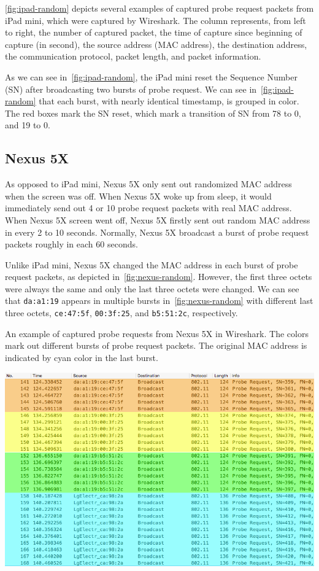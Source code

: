 	\autoref{fig:ipad-random} depicts several examples of captured probe request packets from iPad mini, which were captured by Wireshark. The column represents, from left to right, the number of captured packet, the time of capture since beginning of capture (in second), the source address (\ac{MAC} address), the destination address, the communication protocol, packet length, and packet information.
	
	As we can see in~\autoref{fig:ipad-random}, the iPad mini reset the Sequence Number (\ac{SN}) after broadcasting two bursts of probe request. We can see in~\autoref{fig:ipad-random} that each burst, with nearly identical timestamp, is grouped in color. The red boxes mark the \ac{SN} reset, which mark a transition of \ac{SN} from 78 to 0, and 19 to 0.


	\subsection{Nexus 5X} %
	\label{sub:lg_nexus_5x}
	As opposed to iPad mini, Nexus 5X only sent out randomized \ac{MAC} address when the screen was off. When Nexus 5X woke up from sleep, it would immediately send out 4 or 10 probe request packets with real \ac{MAC} address. When Nexus 5X screen went off, Nexus 5X firstly sent out random \ac{MAC} address in every 2 to 10 seconds. Normally, Nexus 5X broadcast a burst of probe request packets roughly in each 60 seconds.

	Unlike iPad mini, Nexus 5X changed the \ac{MAC} address in each burst of probe request packets, as depicted in~\autoref{fig:nexus-random}. However, the first three octets were always the same and only the last three octets were changed. We can see that \verb|da:a1:19| appears in multiple bursts in~\autoref{fig:nexus-random} with different last three octets, \verb|ce:47:5f|, \verb|00:3f:25|, and \verb|b5:51:2c|, respectively.
	
	\begin{table}[h]
		\centering
		\caption[An example of captured probe requests from Nexus 5X.]{An example of captured probe requests from Nexus 5X in Wireshark. The colors mark out different bursts of probe request packets. The original \ac{MAC} address is indicated by cyan color in the last burst.}
		\label{fig:nexus-random}
		\includegraphics[width=\textwidth]{./img/result/randomization/nexus-5x}
	\end{table}	

